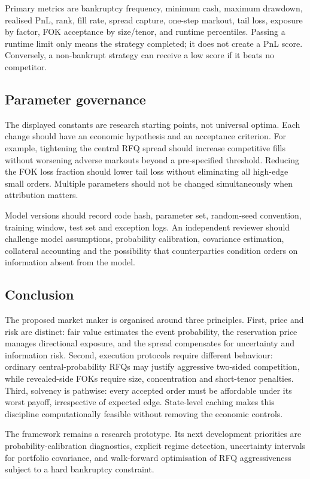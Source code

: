 \documentclass[10pt,a4paper]{article}
\newcommand{\1}{\mathbf{1}}
\begin{document}
Primary metrics are bankruptcy frequency, minimum cash, maximum drawdown, realised
PnL, rank, fill rate, spread capture, one-step markout, tail loss, exposure by factor,
FOK acceptance by size/tenor, and runtime percentiles.  Passing a runtime limit only
means the strategy completed; it does not create a PnL score.  Conversely, a
non-bankrupt strategy can receive a low score if it beats no competitor.

\subsection{Parameter governance}
The displayed constants are research starting points, not universal optima.  Each
change should have an economic hypothesis and an acceptance criterion.  For example,
tightening the central RFQ spread should increase competitive fills without worsening
adverse markouts beyond a pre-specified threshold.  Reducing the FOK loss fraction
should lower tail loss without eliminating all high-edge small orders.  Multiple
parameters should not be changed simultaneously when attribution matters.

Model versions should record code hash, parameter set, random-seed convention, training
window, test set and exception logs.  An independent reviewer should challenge model
assumptions, probability calibration, covariance estimation, collateral accounting and
the possibility that counterparties condition orders on information absent from the
model.

\subsection{Conclusion}
The proposed market maker is organised around three principles.  First, price and risk
are distinct: fair value estimates the event probability, the reservation price manages
directional exposure, and the spread compensates for uncertainty and information risk.
Second, execution protocols require different behaviour: ordinary central-probability
RFQs may justify aggressive two-sided competition, while revealed-side FOKs require
size, concentration and short-tenor penalties.  Third, solvency is pathwise: every
accepted order must be affordable under its worst payoff, irrespective of expected
edge.  State-level caching makes this discipline computationally feasible without
removing the economic controls.

The framework remains a research prototype.  Its next development priorities are
probability-calibration diagnostics, explicit regime detection, uncertainty intervals
for portfolio covariance, and walk-forward optimisation of RFQ aggressiveness subject
to a hard bankruptcy constraint.
\end{document}
